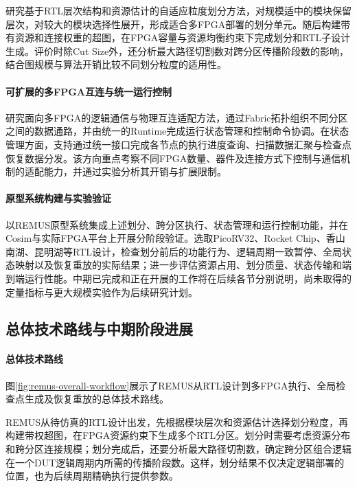 研究基于RTL层次结构和资源估计的自适应粒度划分方法，对规模适中的模块保留层次，对较大的模块选择性展开，形成适合多FPGA部署的划分单元。随后构建带有资源和连接权重的超图，在FPGA容量与资源均衡约束下完成划分和RTL子设计生成。评价时除Cut Size外，还分析最大路径切割数对跨分区传播阶段数的影响，结合图规模与算法开销比较不同划分粒度的适用性。

\paragraph{可扩展的多FPGA互连与统一运行控制}

研究面向多FPGA的逻辑通信与物理互连适配方法，通过Fabric拓扑组织不同分区之间的数据通路，并由统一的Runtime完成运行状态管理和控制命令协调。在状态管理方面，支持通过统一接口完成各节点的执行进度查询、扫描数据汇聚与检查点恢复数据分发。该方向重点考察不同FPGA数量、器件及连接方式下控制与通信机制的适配能力，并通过实验分析其开销与扩展限制。

\paragraph{原型系统构建与实验验证}

以REMUS原型系统集成上述划分、跨分区执行、状态管理和运行控制功能，并在Cosim与实际FPGA平台上开展分阶段验证。选取PicoRV32、Rocket Chip、香山南湖、昆明湖等RTL设计，检查划分前后的功能行为、逻辑周期一致暂停、全局状态映射以及恢复重放的实际结果；进一步评估资源占用、划分质量、状态传输和端到端运行性能。中期已完成和正在开展的工作将在后续各节分别说明，尚未取得的定量指标与更大规模实验作为后续研究计划。

\subsection{总体技术路线与中期阶段进展}

\paragraph{总体技术路线}

图\ref{fig:remus-overall-workflow}展示了REMUS从RTL设计到多FPGA执行、全局检查点生成及恢复重放的总体技术路线。

REMUS从待仿真的RTL设计出发，先根据模块层次和资源估计选择划分粒度，再构建带权超图，在FPGA资源约束下生成多个RTL分区。划分时需要考虑资源分布和跨分区连接规模；划分完成后，还要分析最大路径切割数，确定跨分区组合逻辑在一个DUT逻辑周期内所需的传播阶段数。这样，划分结果不仅决定逻辑部署的位置，也为后续周期精确执行提供参数。

